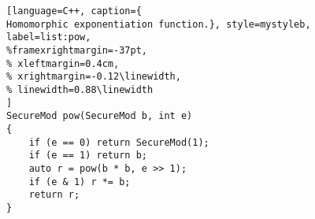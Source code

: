 \begin{figure}[t]
\begin{minipage}{\linewidth}
\begin{lstlisting}[language=C++, caption={
Homomorphic exponentiation function.}, style=mystyleb, label=list:pow,
%framexrightmargin=-37pt,
% xleftmargin=0.4cm,
% xrightmargin=-0.12\linewidth,
% linewidth=0.88\linewidth
]
SecureMod pow(SecureMod b, int e)
{
    if (e == 0) return SecureMod(1);
    if (e == 1) return b;
    auto r = pow(b * b, e >> 1);
    if (e & 1) r *= b;
    return r;
}
\end{lstlisting}
\end{minipage}
\vspace{-0.5cm} 
\end{figure}
